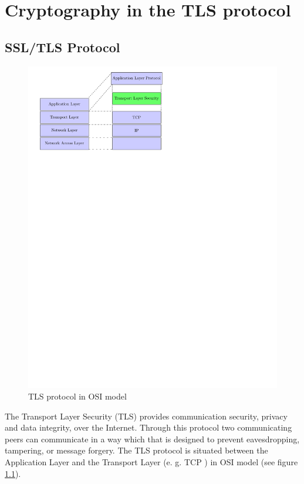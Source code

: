 \chapter{Cryptography in the TLS protocol}

\section{SSL/TLS Protocol}
\label{tls_proto}

\begin{figure}[!ht]
\centering
\includegraphics[trim=0cm 20.5cm 8cm 0cm]{figures/tls_osi.pdf}
\caption{TLS protocol in OSI model}
\label{fig:osi}
\end{figure}

The Transport Layer Security (TLS) \cite{RFC5246}  provides communication
security, privacy and data integrity, over the Internet. Through this protocol two communicating peers
can communicate in a way which that is designed to prevent eavesdropping, tampering, or message forgery.
The TLS protocol is situated between the Application Layer and the Transport
Layer (e. g. TCP \cite{RFC0793}) in OSI model (see figure \ref{fig:osi}).

